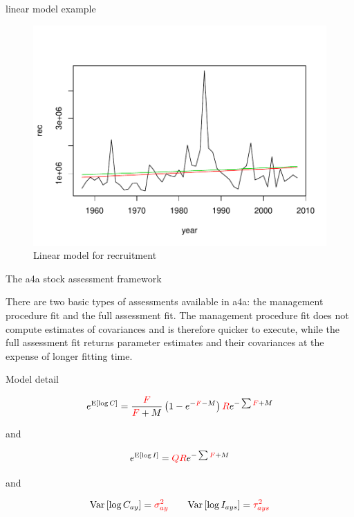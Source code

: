 \documentclass{beamer}\usepackage[]{graphicx}\usepackage[]{color}
\makeatletter
\def\maxwidth{ %
  \ifdim\Gin@nat@width>\linewidth
    \linewidth
  \else
    \Gin@nat@width
  \fi
}
\newenvironment{knitrout}{}{} %
\makeatother
\begin{document}
\begin{frame}{linear model example}
\begin{knitrout}
\color{fgcolor}\begin{figure}[]

\includegraphics[width=\maxwidth]{figure/unnamed-chunk-2} \caption[Linear model for recruitment]{Linear model for recruitment\label{fig:unnamed-chunk-2}}
\end{figure}


\end{knitrout}

\end{frame}

\begin{frame}{The a4a stock assessment framework}

There are two basic types of assessments available in a4a: the management procedure fit and the full assessment fit. The management procedure fit does not compute estimates of covariances and is therefore quicker to execute, while the full assessment fit returns parameter estimates and their covariances at the expense of longer fitting time.

\end{frame}

\begin{frame}{Model detail}

\begin{equation*}
e^{\text{E}\left[\log C\right]} = \frac{\color{red}F}{{\color{red}F}+M}\left(1 - e^{-{\color{red}F}-M}\right) {\color{red}R}e^{-\sum {\color{red}F} + M}
\end{equation*}

and

\begin{equation*}
e^{\text{E}\left[\log I\right]} = {\color{red}Q} {\color{red}R}e^{-\sum {\color{red}F} + M}
\end{equation*}

and

\begin{equation*}
\text{Var}\left[\log C_{ay}\right] = {\color{red}\sigma^2_{ay}} \qquad \text{Var}\left[\log I_{ays}\right] = {\color{red}\tau^2_{ays}}
\end{equation*}

\end{frame} 
\end{document}
